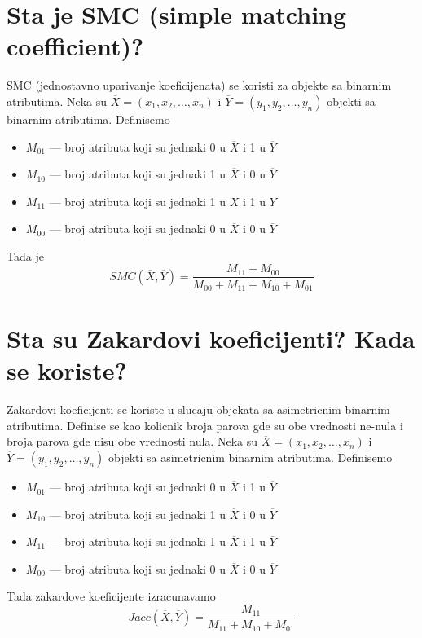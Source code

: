 \documentclass[a4paper]{article}
\begin{document}
\section{Sta je SMC (simple matching coefficient)?}
SMC (jednostavno uparivanje koeficijenata) se koristi za objekte sa binarnim atributima. Neka su
\(\overline{X}=(x_1,x_2,\ldots,x_n)\) i \(\overline{Y}=(y_1,y_2,\ldots,y_n)\) objekti sa binarnim
atributima. Definisemo
\begin{itemize}
    \item \(M_{01}\) --- broj atributa koji su jednaki 0 u \(\overline{X}\) i 1 u \(\overline{Y}\)
    \item \(M_{10}\) --- broj atributa koji su jednaki 1 u \(\overline{X}\) i 0 u \(\overline{Y}\)
    \item \(M_{11}\) --- broj atributa koji su jednaki 1 u \(\overline{X}\) i 1 u \(\overline{Y}\)
    \item \(M_{00}\) --- broj atributa koji su jednaki 0 u \(\overline{X}\) i 0 u \(\overline{Y}\)
\end{itemize}
Tada je
\[SMC(\overline{X}, \overline{Y}) = \dfrac{M_{11} + M_{00}}{M_{00} + M_{11} + M_{10} + M_{01}} \]

\section{Sta su Zakardovi koeficijenti? Kada se koriste?}
Zakardovi koeficijenti se koriste u slucaju objekata sa asimetricnim binarnim atributima. Definise
se kao kolicnik broja parova gde su obe vrednosti ne-nula i broja parova gde nisu obe vrednosti
nula. Neka su \(\overline{X}=(x_1,x_2,\ldots,x_n)\) i \(\overline{Y}=(y_1,y_2,\ldots,y_n)\) objekti
sa asimetricnim binarnim atributima. Definisemo
\begin{itemize}
    \item \(M_{01}\) --- broj atributa koji su jednaki 0 u \(\overline{X}\) i 1 u \(\overline{Y}\)
    \item \(M_{10}\) --- broj atributa koji su jednaki 1 u \(\overline{X}\) i 0 u \(\overline{Y}\)
    \item \(M_{11}\) --- broj atributa koji su jednaki 1 u \(\overline{X}\) i 1 u \(\overline{Y}\)
    \item \(M_{00}\) --- broj atributa koji su jednaki 0 u \(\overline{X}\) i 0 u \(\overline{Y}\)
\end{itemize}
Tada zakardove koeficijente izracunavamo
\[Jacc(\overline{X}, \overline{Y}) = \dfrac{M_{11}}{M_{11} + M_{10} + M_{01}}\]
\end{document}
